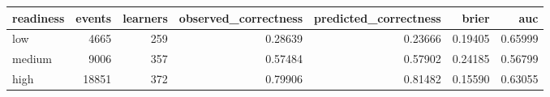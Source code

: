 \begin{tabular}{lrrrrrr}
\toprule
readiness & events & learners & observed\_correctness & predicted\_correctness & brier & auc \\
\midrule
low & 4665 & 259 & 0.28639 & 0.23666 & 0.19405 & 0.65999 \\
medium & 9006 & 357 & 0.57484 & 0.57902 & 0.24185 & 0.56799 \\
high & 18851 & 372 & 0.79906 & 0.81482 & 0.15590 & 0.63055 \\
\bottomrule
\end{tabular}
